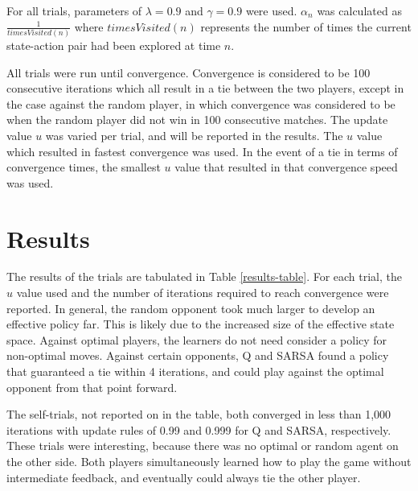 \documentclass{article}
\begin{document}
For all trials, parameters of $\lambda = 0.9$ and $\gamma = 0.9$ were used. $\alpha_n$ was calculated as $\frac{1}{timesVisited(n)}$ where $timesVisited(n)$ represents the number of times the current state-action pair had been explored at time $n$.

All trials were run until convergence. Convergence is considered to be 100 consecutive iterations which all result in a tie between the two players, except in the case against the random player, in which convergence was considered to be when the random player did not win in 100 consecutive matches. The update value $u$ was varied per trial, and will be reported in the results. The $u$ value which resulted in fastest convergence was used. In the event of a tie in terms of convergence times, the smallest $u$ value that resulted in that convergence speed was used.

\section{Results}

The results of the trials are tabulated in Table \ref{results-table}. For each trial, the $u$ value used and the number of iterations required to reach convergence were reported. In general, the random opponent took much larger to develop an effective policy far. This is likely due to the increased size of the effective state space. Against optimal players, the learners do not need consider a policy for non-optimal moves. Against certain opponents, Q and SARSA found a policy that guaranteed a tie within 4 iterations, and could play against the optimal opponent from that point forward.

The self-trials, not reported on in the table, both converged in less than 1,000 iterations with update rules of 0.99 and 0.999 for Q and SARSA, respectively. These trials were interesting, because there was no optimal or random agent on the other side. Both players simultaneously learned how to play the game without intermediate feedback, and eventually could always tie the other player.
\end{document}
